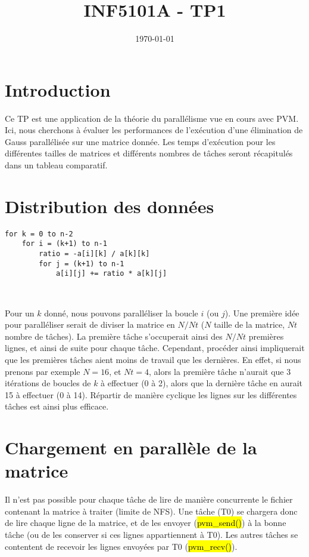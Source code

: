 \documentclass[a4paper,table]{article}
\title{INF5101A - TP1}
\date{\today}
\begin{document}
\maketitle
\newpage
\tableofcontents
\newpage

\section{Introduction}

Ce TP est une application de la théorie du parallélisme vue en cours avec PVM.
Ici, nous cherchons à évaluer les performances de l'exécution d'une élimination
de Gauss parallélisée sur une matrice donnée. Les temps d'exécution pour les
différentes tailles de matrices et différents nombres de tâches seront
récapitulés dans un tableau comparatif.

\section{Distribution des données}

\begin{lstlisting}
for k = 0 to n-2
	for i = (k+1) to n-1
		ratio = -a[i][k] / a[k][k]
		for j = (k+1) to n-1
			a[i][j] += ratio * a[k][j]
\end{lstlisting}
\

Pour un $k$ donné, nous pouvons paralléliser la boucle $i$ (ou $j$). Une première
idée pour paralléliser serait de diviser la matrice en $N/Nt$ ($N$ taille de la
matrice, $Nt$ nombre de tâches). La première tâche s'occuperait ainsi des $N/Nt$
premières lignes, et ainsi de suite pour chaque tâche. Cependant, procéder ainsi
impliquerait que les premières tâches aient moins de travail que les dernières.
En effet, si nous prenons par exemple $N = 16$, et $Nt = 4$, alors la première
tâche n'aurait que 3 itérations de boucles de $k$ à effectuer (0 à 2), alors que
la dernière tâche en aurait 15 à effectuer (0 à 14). Répartir de manière cyclique
les lignes sur les différentes tâches est ainsi plus efficace.

\newpage

\section{Chargement en parallèle de la matrice}

Il n'est pas possible pour chaque tâche de lire de manière concurrente le
fichier contenant la matrice à traiter (limite de NFS). Une tâche (T0) se chargera
donc de lire chaque ligne de la matrice, et de les envoyer (\hl{pvm\_send()}) à
la bonne tâche (ou de les conserver si ces lignes appartiennent à T0). Les
autres tâches se contentent de recevoir les lignes envoyées par T0
(\hl{pvm\_recv()}).\\
\end{document}
